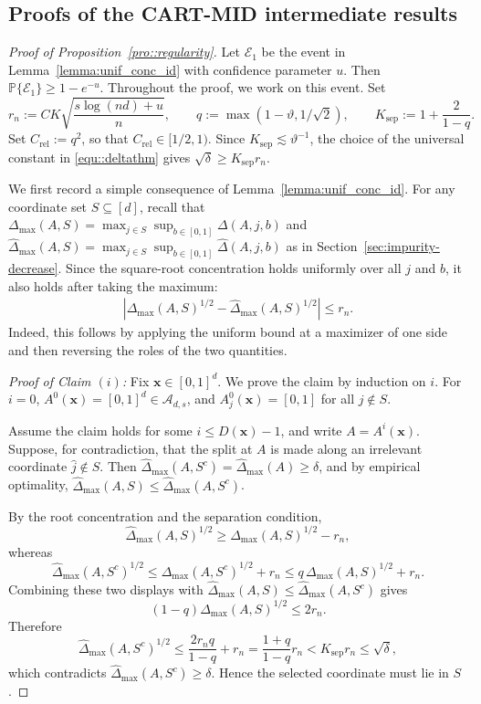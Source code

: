 \documentclass[11pt]{article}
\theoremstyle{plain}
\theoremstyle{definition}
\theoremstyle{remark}
\theoremstyle{plain}
\newcommand{\bx}{\mathbf{x}}
\renewcommand{\P}{\mathbb{P}}
\newcommand{\1}{\mathbbm{1}}
\begin{document}
\subsection{Proofs of the CART-MID intermediate results}

\begin{proof}[Proof of Proposition~\ref{pro::regularity}]
Let $\mathcal E_1$ be the event in Lemma~\ref{lemma:unif_conc_id}
with confidence parameter $u$. Then $\P\{\mathcal E_1\}\ge 1-e^{-u}$.
Throughout the proof, we work on this event. Set
\[
r_n:=
C K
\sqrt{\frac{s\log(nd)+u}{n}},
\qquad
q:=\max(1-\vartheta,1/\sqrt{2}),
\qquad
K_{\mathrm{sep}}:=1+\frac{2}{1-q}.
\]
Set $C_{\mathrm{rel}}:=q^2$, so that $C_{\mathrm{rel}}\in[1/2,1)$.
Since $K_{\mathrm{sep}}\lesssim\vartheta^{-1}$, the choice of the universal
constant in \eqref{equ::deltathm} gives
$\sqrt{\delta}\ge K_{\mathrm{sep}} r_n$. 

We first record a simple consequence of Lemma~\ref{lemma:unif_conc_id}.
For any coordinate set $S\subseteq[d]$, recall that $
\Delta_{\max}(A,S)=\max_{j\in S}\sup_{b\in[0,1]}\Delta(A,j,b)$ and $
\widehat\Delta_{\max}(A,S)=
\max_{j\in S}\sup_{b\in[0,1]}\widehat\Delta(A,j,b)$ as in Section~\ref{sec:impurity-decrease}.
Since the square-root concentration holds uniformly over all $j$ and
$b$, it also holds after taking the maximum:
\begin{align}\label{equ::root_conc_max}
\left|
\Delta_{\max}(A,S)^{1/2}
-
\widehat\Delta_{\max}(A,S)^{1/2}
\right|
\le r_n .
\end{align}
Indeed, this follows by applying the uniform bound at a maximizer of
one side and then reversing the roles of the two quantities.

\smallskip
\noindent
\textit{Proof of Claim $(i)$:}
Fix $\bx\in[0,1]^d$. We prove the claim by induction on $i$.
For $i=0$, $A^0(\bx)=[0,1]^d\in\mathcal A_{d,s}$, and
$A^0_j(\bx)=[0,1]$ for all $j\notin S$.

Assume the claim holds for some $i\le D(\bx)-1$, and write
$A=A^i(\bx)$. Suppose, for contradiction, that the split at $A$ is made
along an irrelevant coordinate $\hat j\notin S$. Then $
\widehat\Delta_{\max}(A,S^c)=\widehat\Delta_{\max}(A)\ge \delta$,
and by empirical optimality,
$\widehat\Delta_{\max}(A,S)\le \widehat\Delta_{\max}(A,S^c)$.

By the root concentration and the separation condition,
\[
\widehat\Delta_{\max}(A,S)^{1/2}
\ge
\Delta_{\max}(A,S)^{1/2}-r_n,
\]
whereas
\[
\widehat\Delta_{\max}(A,S^c)^{1/2}
\le
\Delta_{\max}(A,S^c)^{1/2}+r_n
\le
q\,\Delta_{\max}(A,S)^{1/2}+r_n.
\]
Combining these two displays with
$\widehat\Delta_{\max}(A,S)\le\widehat\Delta_{\max}(A,S^c)$ gives
\[
(1-q)\Delta_{\max}(A,S)^{1/2}\le 2r_n.
\]
Therefore
\[
\widehat\Delta_{\max}(A,S^c)^{1/2}
\le
\frac{2r_nq}{1-q}+r_n
=
\frac{1+q}{1-q}r_n
<
K_{\mathrm{sep}} r_n
\le
\sqrt{\delta},
\]
which contradicts $\widehat\Delta_{\max}(A,S^c)\ge\delta$.
Hence the selected coordinate must lie in $S$.


\end{proof}
\end{document}
